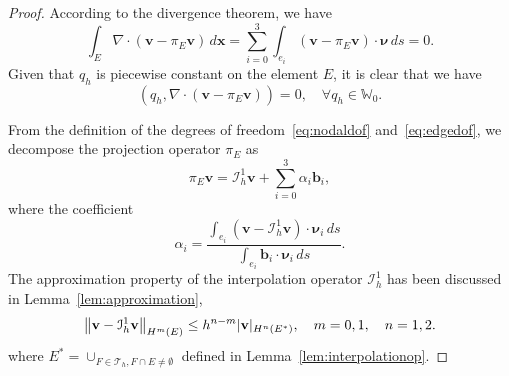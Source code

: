\begin{proof}
According to the divergence theorem, we have
\begin{equation}
\int_{E} \nabla \cdot (\mathbf{v} - \pi_E \mathbf{v})\, d\mathbf{x} = \sum_{i=0}^3 \int_{e_i} (\mathbf{v} - \pi_E \mathbf{v}) \cdot \pmb{\nu}\, ds = 0.
\end{equation}
Given that $q_h$ is piecewise constant on the element $E$, it is  clear that we have
\begin{equation}
(q_h, \nabla \cdot (\mathbf{v} - \pi_E \mathbf{v})) = 0, \quad \forall q_h \in \mathbb{W}_0.
\end{equation}

From the definition of the degrees of freedom~\eqref{eq:nodaldof} and~\eqref{eq:edgedof}, we decompose the projection
operator $\pi_E$ as
\begin{equation}\label{eq:decomposition}
		  \pi_E \mathbf{v} = \mathcal{I}^1_{h} \mathbf{v} + 
		  \sum_{i=0}^3 \alpha_i \mathbf{b}_i,
\end{equation}
where the coefficient 
\begin{equation}
		  \alpha_i = \frac{ \int_{e_i} (\mathbf{v} - \mathcal{I}^1_{h} \mathbf{v})\cdot \pmb{\nu}_i\, ds}{\int_{e_i} \mathbf{b}_i \cdot 
		  \pmb{\nu}_i\, ds}.
\end{equation}
The approximation property of the interpolation operator $\mathcal{I}_h^1$ has been discussed in Lemma~\ref{lem:approximation},
\begin{equation}\label{eq:interpoapproxbr}
\left\lVert\mathbf{v} - \mathcal{I}^1_{h}\mathbf{v}\right\rVert_{H^m(E)} \leq h^{n-m} \lvert \mathbf{v} \rvert_{H^n(E^*)}, \quad m= 0,1, \quad n = 1,2.
\end{equation}
where $E^* = \cup_{F\in \mathcal{T}_h, F\cap E \neq \emptyset}$ defined in Lemma~\ref{lem:interpolationop}.


\end{proof}
